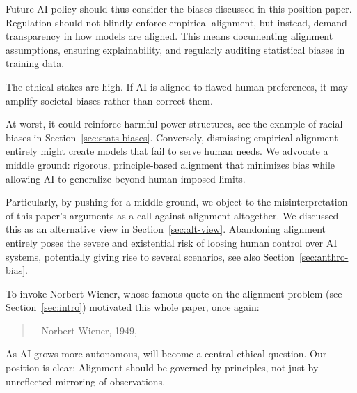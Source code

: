 \documentclass{article}
\theoremstyle{plain}
\theoremstyle{definition}
\theoremstyle{remark}
\begin{document}
Future AI policy should thus consider the biases discussed in this position paper. Regulation should not blindly enforce empirical alignment, but instead, demand transparency in how models are aligned. This means documenting alignment assumptions, ensuring explainability, and regularly auditing statistical biases in training data.

The ethical stakes are high. If AI is aligned to flawed human preferences, it may amplify societal biases rather than correct them. 

At worst, it could reinforce harmful power structures, see the example of racial biases in Section~\ref{sec:stats-biases}. Conversely, dismissing empirical alignment entirely might create models that fail to serve human needs. We advocate a middle ground: rigorous, principle-based alignment that minimizes bias while allowing AI to generalize beyond human-imposed limits. 

Particularly, by pushing for a middle ground, we object to the misinterpretation of this paper's arguments as a call against alignment altogether. We discussed this as an alternative view in Section~\ref{sec:alt-view}. Abandoning alignment entirely poses the severe and existential risk of loosing human control over AI systems, potentially giving rise to several  scenarios, see also Section~\ref{sec:anthro-bias}.

To invoke Norbert Wiener, whose famous quote on the alignment problem (see Section~\ref{sec:intro}) motivated this whole paper, once again:

\begin{small}
    \begin{quote}
         \flushright -- Norbert Wiener, 1949, \citet[acc. 01/15/25]{wiener-nyt}
    \end{quote}
\end{small}

As AI grows more autonomous,  will become a central ethical question. Our position is clear: Alignment should be governed by principles, not just by unreflected mirroring of observations.


\end{document}
